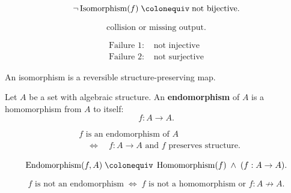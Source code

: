 \begin{remark*}
\[
\neg \operatorname{Isomorphism}(f)
\;\colonequiv\;
\text{not bijective}.
\]
\end{remark*}

\begin{remark*}
\[
\text{collision or missing output}.
\]
\end{remark*}

\begin{remark*}
\[
\begin{aligned}
\text{Failure 1: } &\text{not injective} \\
\text{Failure 2: } &\text{not surjective}
\end{aligned}
\]
\end{remark*}

\begin{remark*}[Interpretation]
An isomorphism is a reversible structure-preserving map.
\end{remark*}





\begin{tcolorbox}[title={Definition --- Endomorphism}]
\begin{definition}[Endomorphism]
\label{def:endomorphism}
Let $A$ be a set with algebraic structure. An \textbf{endomorphism} of $A$
is a homomorphism from $A$ to itself:
\[
f : A \to A.
\]
\end{definition}
\end{tcolorbox}

\begin{remark*}
\[
\begin{aligned}
&f \text{ is an endomorphism of } A \\
&\quad\Longleftrightarrow\quad
f : A \to A \text{ and } f \text{ preserves structure}.
\end{aligned}
\]
\end{remark*}

\begin{remark*}
\[
\operatorname{Endomorphism}(f,A)
\;\colonequiv\;
\operatorname{Homomorphism}(f)
\;\land\;
(f : A \to A).
\]
\end{remark*}

\begin{remark*}
\[
f \text{ is not an endomorphism}
\;\Longleftrightarrow\;
\text{$f$ is not a homomorphism or } f : A \not\to A.
\]
\end{remark*}

